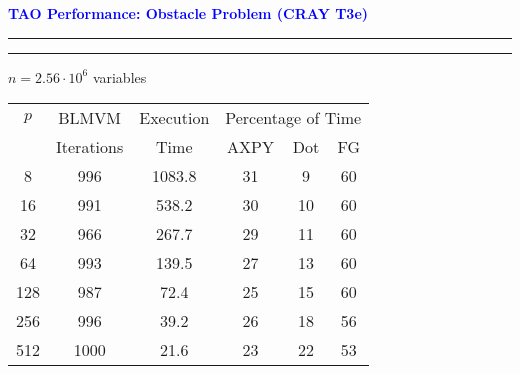 \documentclass{seminar}
\newcommand{\redstripe}{\textcolor{red}{\hrule height 2.0pt\hfil}
             \vspace{-1.8pt}
             \textcolor{red}{\hrule height 1.0pt\hfil}
}
\newcommand{\heading}[1]{%
   \centerline{\textcolor{blue}{\textbf{#1}}}%
    \redstripe%
    \bigskip
}
\begin{document}
\begin{slide}
\heading{TAO Performance: Obstacle Problem (CRAY T3e)}

\centerline{$ n = 2.56 \cdot 10^6 $ variables}

\begin{table}[bhpt]
\small
\begin{center}
\begin{tabular}{|cccccc|}
\hline
\multicolumn{1}{|c|}{$p$} &
\multicolumn{1}{c|}{BLMVM} &
\multicolumn{1}{c|}{Execution} &
\multicolumn{3}{c|}{Percentage of Time} \\
\multicolumn{1}{|c|}{}&
\multicolumn{1}{|c|}{Iterations}&
\multicolumn{1}{c|}{Time}&
\multicolumn{1}{c}{AXPY}&
\multicolumn{1}{c}{Dot} &
\multicolumn{1}{c|}{FG} \\
\hline
8 & 996 & 1083.8 & 31  & 9 & 60 \\ %
16 & 991 & 538.2 & 30 & 10 & 60 \\ %
32 & 966 & 267.7 & 29 & 11 & 60 \\ %
64 & 993 & 139.5 & 27 & 13 & 60 \\ %
128 & 987 & 72.4 & 25 & 15 & 60 \\ %
256 & 996 & 39.2 & 26 & 18 & 56 \\ %
512 & 1000 & 21.6 & 23 & 22 & 53 \\
\hline
\end{tabular}
\label{routines}
\end{center}
\end{table}

\vfill

\end{slide}
\end{document}
